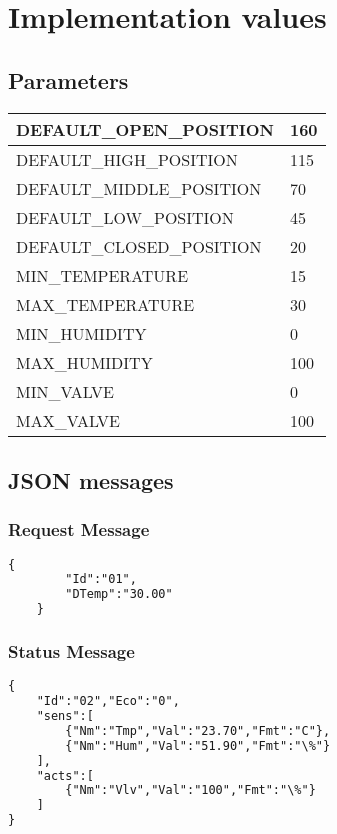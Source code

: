 \section{Implementation values}
\subsection{Parameters}
\begin{center}
	\begin{tabular}{||l | l||}
		\hline
		DEFAULT\_OPEN\_POSITION 	& 160 \\ 
		\hline
		DEFAULT\_HIGH\_POSITION 	& 115 \\ 
		\hline
		DEFAULT\_MIDDLE\_POSITION 	& 70 \\ 
		\hline
		DEFAULT\_LOW\_POSITION 		& 45 \\ 
		\hline
		DEFAULT\_CLOSED\_POSITION	& 20 \\ 
		\hline
		MIN\_TEMPERATURE	& 15 \\
		\hline
		MAX\_TEMPERATURE	& 30 \\
		\hline
		MIN\_HUMIDITY	& 0 \\
		\hline
		MAX\_HUMIDITY	& 100 \\
		\hline
		MIN\_VALVE		& 0 \\
		\hline
		MAX\_VALVE		& 100 \\
		\hline
	\end{tabular}
\end{center}

\subsection{JSON messages}

\subsubsection{Request Message}
\lstset{style=custompython}
\begin{lstlisting}[language=XML]
	{
		"Id":"01",
		"DTemp":"30.00"
	}
\end{lstlisting}

\subsubsection{Status Message}
\lstset{style=custompython}
\begin{lstlisting}[language=XML]
{
	"Id":"02","Eco":"0",
	"sens":[
		{"Nm":"Tmp","Val":"23.70","Fmt":"C"},
		{"Nm":"Hum","Val":"51.90","Fmt":"\%"}
	],
	"acts":[
		{"Nm":"Vlv","Val":"100","Fmt":"\%"}
	]
}
\end{lstlisting}